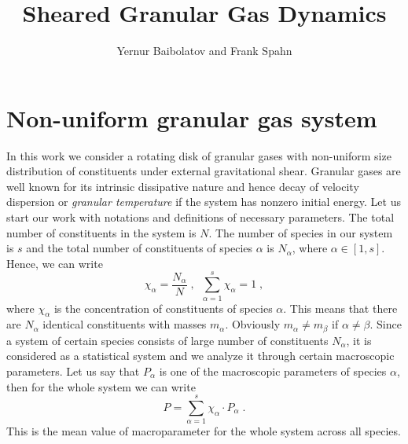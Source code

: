 \documentclass[preprint, aps, pra]{revtex4-1}
\begin{document}
  \title{Sheared Granular Gas Dynamics}
  \author{Yernur Baibolatov and Frank Spahn}
  
\section{Non-uniform granular gas system}
 In this work we consider a rotating disk of granular gases with non-uniform size distribution of constituents
 under external gravitational shear. Granular gases are well known for its intrinsic dissipative nature and hence
 decay of velocity dispersion or \emph{granular temperature} if the system has nonzero initial energy. Let us start
 our work with notations and definitions of necessary parameters. The total number of constituents in the system is $N$.
 The number of species in our system is $s$ and the total number of constituents of species $\alpha$ is $N_\alpha$, 
 where $\alpha\in[1, s]$.
 Hence, we can write
 \begin{equation}
   \chi_\alpha=\frac{N_\alpha}{N}\;,\,\,\,\sum_{\alpha=1}^{s}\chi_\alpha=1\;,
 \end{equation}
 where $\chi_\alpha$ is the concentration of constituents of species $\alpha$.
This means that there are $N_\alpha$ identical constituents with masses $m_\alpha$. 
Obviously $m_\alpha\neq m_\beta$ if $\alpha\neq\beta$. Since a system of certain species consists of large number
of constituents $N_\alpha$, it is considered as a statistical system and we analyze it through certain macroscopic parameters.
Let us say that $P_\alpha$ is one of the macroscopic parameters of species $\alpha$, then for the whole system we can write
\begin{equation}\label{eq:macroparameter_discrete}
  P = \sum_{\alpha=1}^{s}\chi_\alpha\cdot P_\alpha\;.
\end{equation}
This is the mean value of macroparameter for the whole system across all species.
\end{document}
